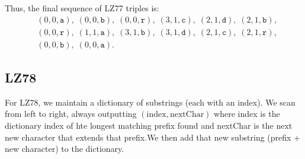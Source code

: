 \documentclass{article}
\begin{document}
Thus, the final sequence of LZ77 triples is:
\[
\begin{aligned}
&(0,0,\texttt{a}),\;(0,0,\texttt{b}),\;(0,0,\texttt{r}),\;(3,1,\texttt{c}),\;(2,1,\texttt{d}),\;(2,1,\texttt{b}),\\
&(0,0,\texttt{r}),\;(1,1,\texttt{a}),\;(3,1,\texttt{b}),\;(3,1,\texttt{d}),\;(2,1,\texttt{c}),\;(2,1,\texttt{r}),\\
&(0,0,\texttt{b}),\;(0,0,\texttt{a}).
\end{aligned}
\]

\subsection{LZ78}

For LZ78, we maintain a dictionary of substrings (each with an index). We scan from left to right, always outputting $(\mathrm{index}, \mathrm{nextChar})$ where index is the dictionary index of hte longest matching prefix found and nextChar is the next new character that extends that prefix.We then add that new substring (prefix + new character) to the dictionary.
\end{document}
